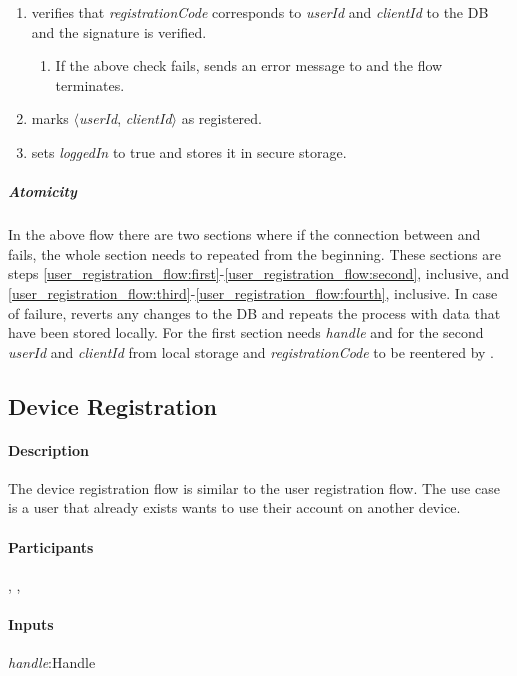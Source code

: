 \documentclass[a4paper,10pt,draft]{article}
\newcommand{\handle}{\emph{handle}}
\newcommand{\registrationCode}{\emph{registrationCode}}
\newcommand{\userId}{\emph{userId}}
\newcommand{\clientId}{\emph{clientId}}
\newcommand{\loggedIn}{\emph{loggedIn}}
\begin{document}
\begin{enumerate}
 \item \Server{} verifies that \registrationCode{} corresponds to \userId{} and \clientId{} to the DB and the signature is verified.
 \begin{enumerate}
  \item If the above check fails, \Server{} sends an error message to \Client{} and the flow terminates.
 \end{enumerate}
 \item\label{user_registration_flow:fourth} \Server{} marks $\langle$\userId{}, \clientId{}$\rangle$ as registered.
 \item \Client{} sets \loggedIn{} to true and stores it in secure storage.
\end{enumerate}

\subparagraph{Atomicity}
In the above flow there are two sections where if the connection between \Server{} and \Client{} fails, the whole section needs to repeated from the beginning. These sections are 
steps \ref{user_registration_flow:first}-\ref{user_registration_flow:second}, inclusive, and \ref{user_registration_flow:third}-\ref{user_registration_flow:fourth}, inclusive. In 
case of failure, \Server{} reverts any changes to the DB and \Client{} repeats the process with data that have been stored locally. For the first section \Client{} needs \handle{} 
and for the second \userId{} and \clientId{} from local storage and \registrationCode{} to be reentered by \User{}.

\subsection{Device Registration}

\paragraph{Description}
The device registration flow is similar to the user registration flow. The use case is a user that already exists wants to use their account on another device.

\paragraph{Participants} \Server{}, \Client{}, \User{}

\paragraph{Inputs}
\SpecialItem
\begin{description}
 \item[\handle{}:Handle]
\end{description}
\end{document}
